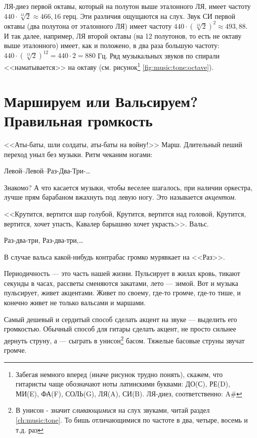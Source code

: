 ЛЯ-диез первой октавы, который на полутон выше эталонного ЛЯ, имеет частоту $440\cdot\sqrt[12]{2}\approx 466,16$ герц. Эти различия ощущаются на слух. Звук СИ первой октавы (два полутона от эталонного ЛЯ) имеет частоту $440\cdot(\sqrt[12]{2})^2\approx 493,88$. И так далее, например, ЛЯ второй октавы (на 12 полутонов, то есть не октаву выше эталонного) имеет, как и положено, в два раза большую частоту: $440\cdot(\sqrt[12]{2})^{12}=440\cdot 2=880$ Гц. Ряд музыкальных звуков по спирали <<наматывается>> на октаву (см. рисунок\footnote{Забегая немного вперед (иначе рисунок трудно понять), скажем, что гитаристы чаще обозначают ноты латинскими буквами: ДО(С), РЕ(D), МИ(E), ФА(F), СОЛЬ(G), ЛЯ(A), СИ(B). ЛЯ-диез, соответственно: A\#} \ref{fig:music:tone:octave}).


\section{Маршируем или Вальсируем? Правильная громкость}
\label{ch:music:volume}

<<Аты-баты, шли солдаты, аты-баты на войну!>> Марш. Длительный пеший переход уныл без музыки. Ритм чеканим ногами: 
\begin{center}
    Левой--Левой--Раз-Два-Три-\ldots 
\end{center}
Знакомо? А что касается музыки, чтобы веселее шагалось, при наличии оркестра, лучше прям барабаном вжахнуть под левую ногу. Это называется \emph{акцентом}. 

<<Крутится, вертится шар голубой, Крутится, вертится над головой, Крутится, вертится, хочет упасть, Кавалер барышню хочет украсть>>. Вальс. 
\begin{center}
    Раз-два-три, Раз-два-три,\ldots 
\end{center}
В случае вальса какой-нибудь контрабас громко мурявкает на <<Раз>>.

Периодичность --- это часть нашей жизни. Пульсирует в жилах кровь, тикают секунды в часах, рассветы сменяются закатами, лето --- зимой. Вот и музыка пульсирует, живет акцентами. Живет по своему, где-то громче, где-то тише, и конечно живет не только вальсами и маршами.

Самый дешевый и сердитый способ сделать акцент на звуке --- выделить его громкостью. Обычный способ для гитары сделать акцент, не просто сильнее дернуть струну, а --- сыграть в унисон\footnote{В унисон - значит \emph{сливающимися} на слух звуками, читай раздел \ref{ch:music:tone}. То бишь отличающимися по частоте в два, четыре, восемь и т.д. раз} басом. Тяжелые басовые струны звучат громче.

